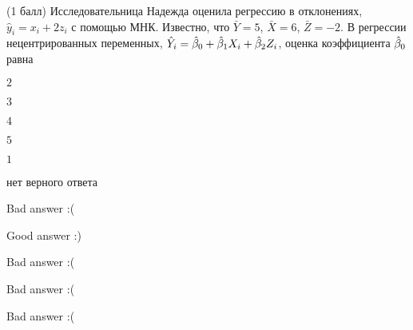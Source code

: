 
\begin{question}
(1 балл) Исследовательница Надежда оценила регрессию в отклонениях,
\(\hat y_i = x_i + 2 z_i\) с помощью МНК. Известно, что \(\bar Y=5\),
\(\bar X =6\), \(\bar Z=-2\). В регрессии нецентрированных переменных,
\(\hat Y_i = \hat{\beta}_0 + \hat{\beta}_1 X_i + \hat{\beta}_2 Z_i\), оценка коэффициента
\(\hat{\beta}_0\) равна
\begin{answerlist}
  \item \(2\)
  \item \(3\)
  \item \(4\)
  \item \(5\)
  \item \(1\)
  \item нет верного ответа
\end{answerlist}
\end{question}

\begin{solution}
\begin{answerlist}
  \item Bad answer :(
  \item Good answer :)
  \item Bad answer :(
  \item Bad answer :(
  \item Bad answer :(
\end{answerlist}
\end{solution}
